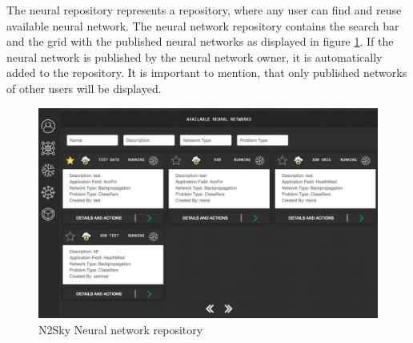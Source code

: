 The neural repository represents a repository, where any user can find and reuse available neural network. The neural network repository contains the search bar and the grid with the published neural networks as displayed in figure \ref{fig:nn_repository}. If the neural network is published by the neural network owner, it is automatically added to the repository. It is important to mention, that only published networks of other users will be displayed. 

\begin{figure}[H]
\begin{center}
  \includegraphics[width=\linewidth]{components/5/img/nn_repository.png}
  \caption{N2Sky Neural network repository}
  \label{fig:nn_repository}
\end{center}
\end{figure}


